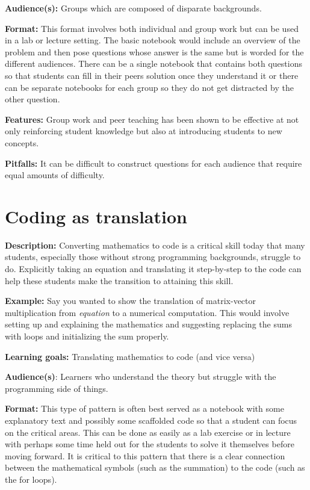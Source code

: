 \documentclass[]{book}
\begin{document}
\textbf{Audience(s):} Groups which are composed of disparate
backgrounds.

\textbf{Format:} This format involves both individual and group work but
can be used in a lab or lecture setting. The basic notebook would
include an overview of the problem and then pose questions whose answer
is the same but is worded for the different audiences. There can be a
single notebook that contains both questions so that students can fill
in their peers solution once they understand it or there can be separate
notebooks for each group so they do not get distracted by the other
question.

\textbf{Features:} Group work and peer teaching has been shown to be
effective at not only reinforcing student knowledge but also at
introducing students to new concepts.

\textbf{Pitfalls:} It can be difficult to construct questions for each
audience that require equal amounts of difficulty.

\section{Coding as translation}\label{coding-as-translation}

\textbf{Description:} Converting mathematics to code is a critical skill
today that many students, especially those without strong programming
backgrounds, struggle to do. Explicitly taking an equation and
translating it step-by-step to the code can help these students make the
transition to attaining this skill.

\textbf{Example:} Say you wanted to show the translation of
matrix-vector multiplication from \emph{equation} to a numerical
computation. This would involve setting up and explaining the
mathematics and suggesting replacing the sums with loops and
initializing the sum properly.

\textbf{Learning goals:} Translating mathematics to code (and vice
versa)

\textbf{Audience(s)}: Learners who understand the theory but struggle
with the programming side of things.

\textbf{Format:} This type of pattern is often best served as a notebook
with some explanatory text and possibly some scaffolded code so that a
student can focus on the critical areas. This can be done as easily as a
lab exercise or in lecture with perhaps some time held out for the
students to solve it themselves before moving forward. It is critical to
this pattern that there is a clear connection between the mathematical
symbols (such as the summation) to the code (such as the for loops).
\end{document}
